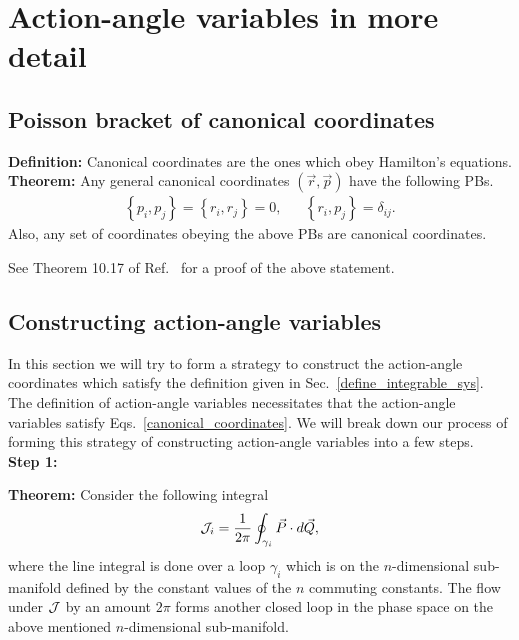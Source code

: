 \chapter{Action-angle variables in more detail}




\section{Poisson bracket of canonical coordinates}

\textbf{Definition:} Canonical coordinates are the ones which obey Hamilton's equations. \\
\textbf{Theorem:}  Any general canonical coordinates $(\vec{r}, \vec{p})$
 have the following PBs.
\begin{align}
\left\{p_{i}, p_{j}\right\}=\left\{r_{i}, r_{j}\right\}=0, 
&&\left\{r_{i}, p_{j}\right\}=\delta_{ij}.      \label{canonical_coordinates}
\end{align}
Also, any set of coordinates obeying the above PBs are canonical coordinates.




\hfill \break


\begin{definition}[label=def:CC]
See Theorem 10.17 of Ref.~\cite{fasano} for a proof of the above statement.
\end{definition}

\hfill \break





\section{Constructing action-angle variables}   \label{construct_AA}


In this section we will try to form a strategy to construct
 the action-angle coordinates
which satisfy the definition given in Sec.~\ref{define_integrable_sys}.
The definition of action-angle variables necessitates that the 
action-angle variables satisfy Eqs.~\ref{canonical_coordinates}.
We will break down our process of forming this strategy 
of constructing action-angle variables into a few steps. \\



\textbf{Step 1:} 


\textbf{Theorem:} Consider the following integral
\begin{align}
\mathcal{J}_i  =   \frac{1}{2 \pi} \oint_{\gamma_i}   \vec{P} \cdot  d\vec{Q},       \label{action_integral}
\end{align}
where the line integral is done over 
a loop $\gamma_i$ which is on the 
$n$-dimensional sub-manifold
defined by the constant values of the $n$ commuting constants.
The flow under $\mathcal{J}$ by an amount $2 \pi$ forms another closed loop
in the phase space on the  above mentioned $n$-dimensional sub-manifold.



